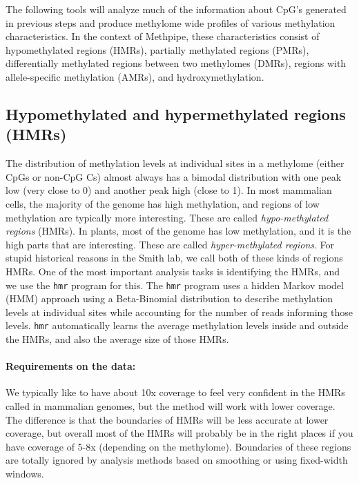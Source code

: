 \documentclass[10pt]{article}
\newcommand{\prog}[1]{\texttt{#1}}
\begin{document}
The following tools will analyze much of the information about CpG's
generated in previous steps and produce methylome wide profiles of
various methylation characteristics. In the context of Methpipe, these
characteristics consist of hypomethylated regions (HMRs), partially
methylated regions (PMRs), differentially methylated regions between
two methylomes (DMRs), regions with allele-specific methylation (AMRs),
and hydroxymethylation.

\subsection{Hypomethylated and hypermethylated regions (HMRs)}
\label{sec:indent-hypo-methyl}

The distribution of methylation levels at individual sites in a
methylome (either CpGs or non-CpG Cs) almost always has a bimodal
distribution with one peak low (very close to 0) and another peak high
(close to 1). In most mammalian cells, the majority of the genome has
high methylation, and regions of low methylation are typically more
interesting. These are called {\em hypo-methylated regions} (HMRs). In
plants, most of the genome has low methylation, and it is the high
parts that are interesting. These are called {\em hyper-methylated
  regions}. For stupid historical reasons in the Smith lab, we call
both of these kinds of regions HMRs. One of the most important
analysis tasks is identifying the HMRs, and we use the \prog{hmr}
program for this. The \prog{hmr} program uses a hidden Markov model
(HMM) approach using a Beta-Binomial distribution to describe
methylation levels at individual sites while accounting for the number
of reads informing those levels. \prog{hmr} automatically learns the
average methylation levels inside and outside the HMRs, and also the
average size of those HMRs.

\paragraph{Requirements on the data:}
We typically like to have about 10x coverage to feel very confident in
the HMRs called in mammalian genomes, but the method will work with
lower coverage. The difference is that the boundaries of HMRs will be
less accurate at lower coverage, but overall most of the HMRs will
probably be in the right places if you have coverage of 5-8x
(depending on the methylome). Boundaries of these regions are totally
ignored by analysis methods based on smoothing or using fixed-width
windows.
\end{document}
